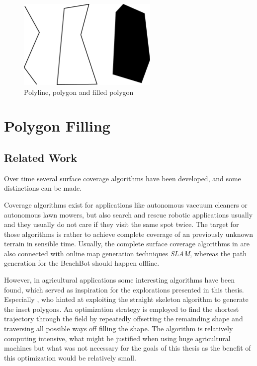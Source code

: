 \documentclass[10pt,twoside,a4paper]{report}
\begin{document}
\begin{figure}
\centering
\includegraphics[width=0.6\textwidth]{images/path_planning/line_polygon_definition.pdf}
\caption{Polyline, polygon and filled polygon}
\label{fig:elements_def}
\end{figure}

\section{Polygon Filling}

\subsection{Related Work}

Over time several surface coverage algorithms have been developed, and some distinctions can be made. 

Coverage algorithms exist for applications like autonomous vaccuum cleaners or autonomous lawn mowers, but also search and rescue robotic applications usually and they usually do not care if they visit the same spot twice. The target for those algorithms is rather to achieve complete coverage of an previously unknown terrain in sensible time. Usually, the complete surface coverage algorithms in are also connected with online map generation techniques \textit{SLAM}, whereas the path generation for the BeachBot should happen offline.

However, in agricultural applications some interesting algorithms have been found, which served as inspiration for the explorations presented in this thesis. Especially \citep{ROB:ROB20300}, who hinted at exploiting the straight skeleton algorithm to generate the inset polygons. An optimization strategy is employed to find the shortest trajectory through the field by repeatedly offsetting the remainding shape and traversing all possible ways off filling the shape. The algorithm is relatively computing intensive, what might be justified when using huge agricultural machines but what was not necessary for the goals of this thesis as the benefit of this optimization would be relatively small.
\end{document}
